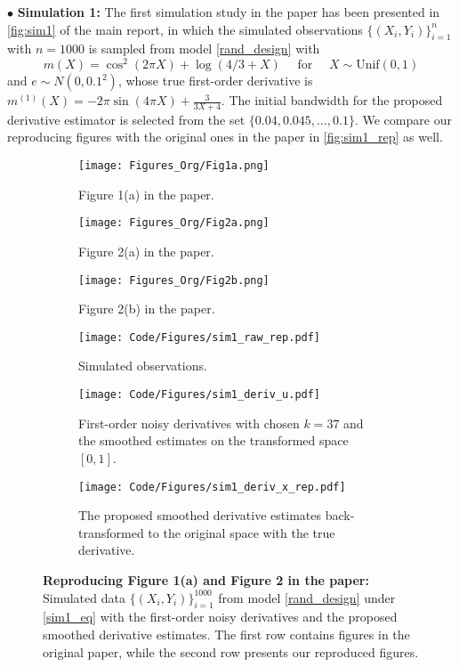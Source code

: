 \documentclass{uwstat572}
\theoremstyle{definition}
\theoremstyle{theorem}
\begin{document}
\indent $\bullet$ {\bf Simulation 1:} The first simulation study in the paper \citep{liu2020smoothed} has been presented in \autoref{fig:sim1} of the main report, in which the simulated observations $\{(X_i,Y_i)\}_{i=1}^n$ with $n=1000$ is sampled from model \eqref{rand_design} with
\begin{equation}
\label{sim1_eq}
m(X) = \cos^2(2\pi X) + \log(4/3 +X) \quad \text{ for } \quad X\sim \mathrm{Unif}(0,1)
\end{equation}
and $e\sim N(0,0.1^2)$, whose true first-order derivative is $m^{(1)}(X)=-2\pi \sin(4\pi X) + \frac{3}{3X+4}$. The initial bandwidth for the proposed derivative estimator is selected from the set $\{0.04, 0.045,...,0.1\}$. We compare our reproducing figures with the original ones in the paper in \autoref{fig:sim1_rep} as well.

\begin{figure}[t]
	\captionsetup[subfigure]{justification=centering}
	\begin{subfigure}[t]{0.32\linewidth}
		\centering
		\texttt{[image: Figures\_Org/Fig1a.png]}
		\caption{Figure 1(a) in the paper.}
	\end{subfigure}
	\hfil
	\begin{subfigure}[t]{0.32\linewidth}
		\centering
		\texttt{[image: Figures\_Org/Fig2a.png]}
		\caption{Figure 2(a) in the paper.}
	\end{subfigure}
    \hfil
    \begin{subfigure}[t]{0.32\linewidth}
    	\centering
    	\texttt{[image: Figures\_Org/Fig2b.png]}
    	\caption{Figure 2(b) in the paper.}
    \end{subfigure}
    \begin{subfigure}[t]{0.32\linewidth}
    	\centering
    	\texttt{[image: Code/Figures/sim1\_raw\_rep.pdf]}
    	\caption{Simulated observations.}
    \end{subfigure}
    \hfil
    \begin{subfigure}[t]{0.32\linewidth}
    	\centering
    	\texttt{[image: Code/Figures/sim1\_deriv\_u.pdf]}
    	\caption{First-order noisy derivatives with chosen $k=37$ and the smoothed estimates on the transformed space $[0,1]$.}
    \end{subfigure}
    \hfil
    \begin{subfigure}[t]{0.32\linewidth}
    	\centering
    	\texttt{[image: Code/Figures/sim1\_deriv\_x\_rep.pdf]}
    	\caption{The proposed smoothed derivative estimates back-transformed to the original space with the true derivative.}
    \end{subfigure}
	\caption{{\bf Reproducing Figure 1(a) and Figure 2 in the paper:} Simulated data $\{(X_i,Y_i)\}_{i=1}^{1000}$ from model \eqref{rand_design} under \eqref{sim1_eq} with the first-order noisy derivatives and the proposed smoothed derivative estimates. The first row contains figures in the original paper, while the second row presents our reproduced figures.}
	\label{fig:sim1_rep}
\end{figure}
\end{document}
